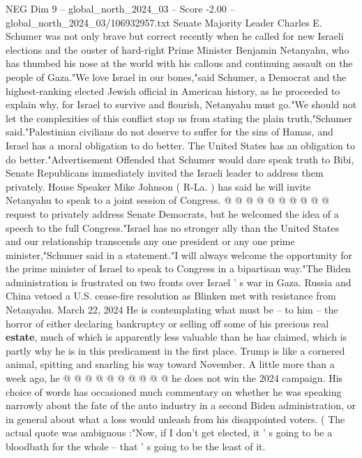 \begin{textsample}{NEG Dim 9 – global\_north\_2024\_03 – Score -2.00 – global\_north\_2024\_03/106932957.txt}  \label{ex:f9_neg_180}
Senate Majority Leader Charles E.
Schumer was not only brave but correct recently when he called for new Israeli elections and the ouster of hard-right Prime Minister Benjamin Netanyahu, who has thumbed his nose at the world with his callous and continuing assault on the people of Gaza."We love Israel in our bones,"said Schumer, a Democrat and the highest-ranking elected Jewish official in American history, as he proceeded to explain why, for Israel to survive and flourish, Netanyahu must go."We should not let the complexities of this conflict stop us from stating the plain truth,"Schumer said."Palestinian civilians do not deserve to suffer for the sins of Hamas, and Israel has a moral obligation to do better.
The United States has an obligation to do better."Advertisement Offended that Schumer would dare speak truth to Bibi, Senate Republicans immediately invited the Israeli leader to address them privately.
House Speaker Mike Johnson ( R-La. ) has said he will invite Netanyahu to speak to a joint session of Congress. @ @ @ @ @ @ @ @ @ @ request to privately address Senate Democrats, but he welcomed the idea of a speech to the full Congress."Israel has no stronger ally than the United States and our relationship transcends any one president or any one prime minister,"Schumer said in a statement."I will always welcome the opportunity for the prime minister of Israel to speak to Congress in a bipartisan way."The Biden administration is frustrated on two fronts over Israel ' s war in Gaza.
Russia and China vetoed a U.S. cease-fire resolution as Blinken met with resistance from Netanyahu.
March 22, 2024 He is contemplating what must be -- to him -- the horror of either declaring bankruptcy or selling off some of his precious real \textbf{estate}, much of which is apparently less valuable than he has claimed, which is partly why he is in this predicament in the first place.
Trump is like a cornered animal, spitting and snarling his way toward November.
A little more than a week ago, he @ @ @ @ @ @ @ @ @ @ he does not win the 2024 campaign.
His choice of words has occasioned much commentary on whether he was speaking narrowly about the fate of the auto industry in a second Biden administration, or in general about what a loss would unleash from his disappointed voters. ( The actual quote was ambiguous :"Now, if I don't get elected, it ' s going to be a bloodbath for the whole -- that ' s going to be the least of it.

\end{textsample}
